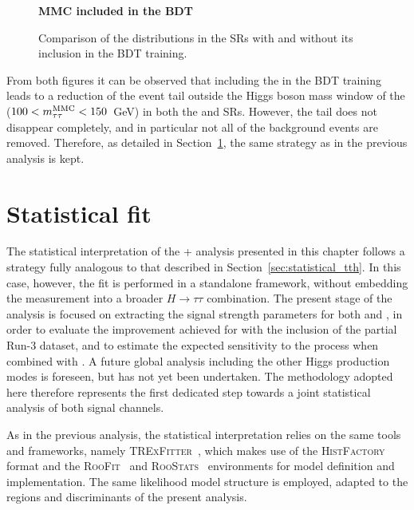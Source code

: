 \begin{figure}[htbp]
  \vspace{0.2cm}
  \begin{minipage}{\textwidth}
    \centering
    \small {\textbf{MMC included in the BDT}}
  \end{minipage}
  \vspace{0.35cm}
  \caption{Comparison of the \mmc distributions in the \thqb SRs with and without its inclusion in the BDT training.}
  \label{mmc_distributions_th}
\end{figure}
From both figures it can be observed that including the \mmc in the BDT training leads to a reduction of the event tail outside the Higgs boson mass window of the \mmc ($100 < m^\text{MMC}_{\tau\tau} < 150$~GeV) in both the \thqb and \ttH SRs. However, the tail does not disappear completely, and in particular not all of the \ttbar background events are removed. Therefore, as detailed in Section~\ref{statistical_th_tth}, the same strategy as in the previous analysis is kept.

\section{Statistical fit}
\label{statistical_th_tth}

The statistical interpretation of the \thqb + \ttH analysis presented in this chapter follows a strategy fully analogous to that described in Section~\ref{sec:statistical_tth}. In this case, however, the fit is performed in a standalone framework, without embedding the measurement into a broader $H \to \tau \tau$ combination. The present stage of the analysis is focused on extracting the signal strength parameters for both \thqb and \ttH, in order to evaluate the improvement achieved for \ttH with the inclusion of the partial Run-3 dataset, and to estimate the expected sensitivity to the \thqb process when combined with \ttH. A future global analysis including the other Higgs production modes is foreseen, but has not yet been undertaken. The methodology adopted here therefore represents the first dedicated step towards a joint statistical analysis of both signal channels.

As in the previous analysis, the statistical interpretation relies on the same tools and frameworks, namely \textsc{TRExFitter}~\cite{TRExFitter}, which makes use of the \textsc{HistFactory}~\cite{HistFactory} format and the \textsc{RooFit}~\cite{RooFit} and \textsc{RooStats}~\cite{RooStats} environments for model definition and implementation. The same likelihood model structure is employed, adapted to the regions and discriminants of the present analysis.

